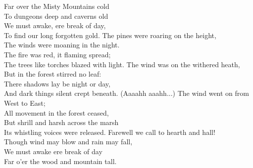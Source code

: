 
Far over the Misty Mountains cold\\
To dungeons deep and caverns old\\
We must awake, ere break of day,\\
To find our long forgotten gold.
\hops
The pines were roaring on the height,\\
The winds were moaning in the night.\\
The fire was red, it flaming spread;\\
The trees like torches blazed with light.
\hops
The wind was on the withered heath,\\
But in the forest stirred no leaf:\\
There shadows lay be night or day,\\
And dark things silent crept beneath.
\hops
(Aaaahh aaahh...)
\hops
The wind went on from West to East;\\
All movement in the forest ceased,\\
But shrill and harsh across the marsh\\
Its whistling voices were released.
\hops
Farewell we call to hearth and hall!\\
Though wind may blow and rain may fall,\\
We must awake ere break of day\\
Far o'er the wood and mountain tall.
